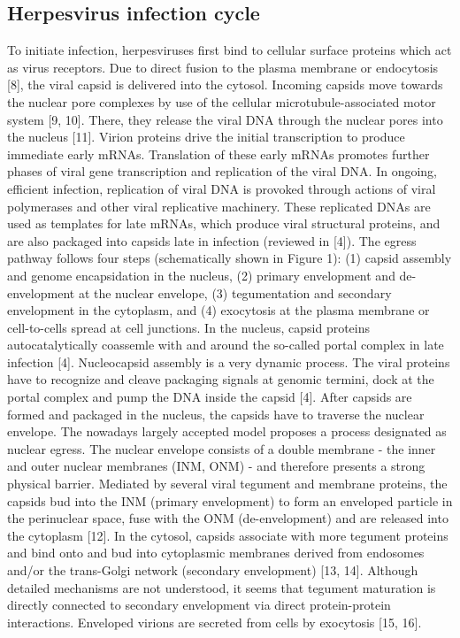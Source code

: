 \subsection{Herpesvirus infection cycle}
To initiate infection, herpesviruses first bind to cellular surface proteins which act as virus receptors.
Due to direct fusion to the plasma membrane or endocytosis [8], the viral capsid is delivered into the cytosol.
Incoming capsids move towards the nuclear pore complexes by use of the cellular microtubule-associated motor system [9, 10].
There, they release the viral DNA through the nuclear pores into the nucleus [11].
Virion proteins drive the initial transcription to produce immediate early mRNAs.
Translation of these early mRNAs promotes further phases of viral gene transcription and replication of the viral DNA.
In ongoing, efficient infection, replication of viral DNA is provoked through actions of viral polymerases and other viral replicative machinery.
These replicated DNAs are used as templates for late mRNAs, which produce viral structural proteins, and are also packaged into capsids late in infection (reviewed in [4]).
The egress pathway follows four steps (schematically shown in Figure 1):
(1) capsid assembly and genome encapsidation in the nucleus,
(2) primary envelopment and de-envelopment at the nuclear envelope,
(3) tegumentation and secondary envelopment in the cytoplasm, and
(4) exocytosis at the plasma membrane or cell-to-cells spread at cell junctions.
In the nucleus, capsid proteins autocatalytically coassemle with and around the so-called portal complex in late infection [4].
Nucleocapsid assembly is a very dynamic process.
The viral proteins have to recognize and cleave packaging signals at genomic termini, dock at the portal complex and pump the DNA inside the capsid [4].
After capsids are formed and packaged in the nucleus, the capsids have to traverse the nuclear envelope.
The nowadays largely accepted model proposes a process designated as nuclear egress.
The nuclear envelope consists of a double membrane - the inner and outer nuclear membranes (INM, ONM) - and therefore presents a strong physical barrier.
Mediated by several viral tegument and membrane proteins, the capsids bud into the INM (primary envelopment) to form an enveloped particle in the perinuclear space, fuse with the ONM (de-envelopment) and are released into the cytoplasm [12].
In the cytosol, capsids associate with more tegument proteins and bind onto and bud into cytoplasmic membranes derived from endosomes and/or the trans-Golgi network (secondary envelopment) [13, 14].
Although detailed mechanisms are not understood, it seems that tegument maturation is directly connected to secondary envelopment via direct protein-protein interactions.
Enveloped virions are secreted from cells by exocytosis [15, 16].

